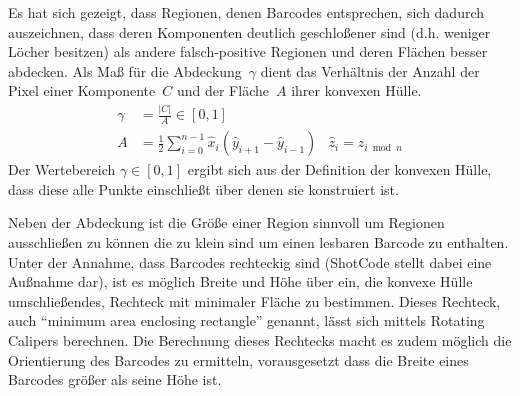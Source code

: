 \begin{enumerate}[(1)]
Es hat sich gezeigt, dass Regionen, denen Barcodes entsprechen, sich dadurch auszeichnen, dass deren Komponenten deutlich geschloßener sind (d.h. weniger Löcher besitzen) als andere falsch-positive Regionen und deren Flächen besser abdecken.
Als Maß für die Abdeckung~$\gamma$ dient das Verhältnis der Anzahl der Pixel einer Komponente~$C$ und der Fläche~$A$ \cite{braden1986} ihrer konvexen Hülle.
\begin{align}
  \gamma &= \frac{|C|}{A} \in [0,1] \\
       A &= \frac{1}{2} \sum_{i=0}^{n-1}{\hat x_i (\hat y_{i+1} - \hat y_{i-1})}
         & \hat z_i = z_{i \bmod n}
\end{align}
Der Wertebereich $\gamma\in[0,1]$ ergibt sich aus der Definition der konvexen Hülle, dass diese alle Punkte einschließt über denen sie konstruiert ist.

Neben der Abdeckung ist die Größe einer Region sinnvoll um Regionen ausschließen zu können die zu klein sind um einen lesbaren Barcode zu enthalten.
Unter der Annahme, dass Barcodes rechteckig sind (ShotCode stellt dabei eine Außnahme dar), ist es möglich Breite und Höhe über ein, die konvexe Hülle umschließendes, Rechteck mit minimaler Fläche zu bestimmen.
Dieses Rechteck, auch "`minimum area enclosing rectangle"' genannt, lässt sich mittels Rotating Calipers berechnen.
Die Berechnung dieses Rechtecks macht es zudem möglich die Orientierung des Barcodes zu ermitteln, vorausgesetzt dass die Breite eines Barcodes größer als seine Höhe ist.
\end{enumerate}


